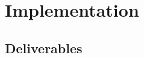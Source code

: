 \documentclass[conference]{IEEEtran} %
\begin{document}





\section{Implementation}
\label{sec:implementation}

\subsection{Deliverables}
\label{subsec:deliverables}
\end{document}
